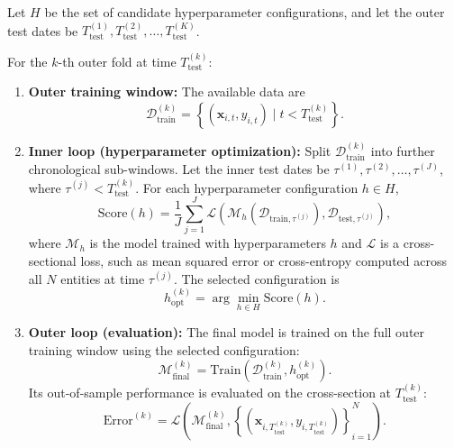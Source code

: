 \medskip

Let $H$ be the set of candidate hyperparameter configurations, and let the outer test dates be $T_{\mathrm{test}}^{(1)}, T_{\mathrm{test}}^{(2)}, \dots, T_{\mathrm{test}}^{(K)}$.

\medskip

For the $k$-th outer fold at time $T_{\mathrm{test}}^{(k)}$:
\begin{enumerate}[topsep=0pt, itemsep=0pt, parsep=0pt]
	\item \textbf{Outer training window:} The available data are
	      \begin{equation}
		      \mathcal{D}_{\mathrm{train}}^{(k)}
		      =
		      \left\{
		      (\mathbf{x}_{i,t}, y_{i,t})
		      \mid
		      t < T_{\mathrm{test}}^{(k)}
		      \right\}.
	      \end{equation}

	\item \textbf{Inner loop (hyperparameter optimization):}
	      Split $\mathcal{D}_{\mathrm{train}}^{(k)}$ into further chronological sub-windows. Let the inner test dates be $\tau^{(1)}, \tau^{(2)}, \dots, \tau^{(J)}$, where $\tau^{(j)} < T_{\mathrm{test}}^{(k)}$. For each hyperparameter configuration $h \in H$,
	      \begin{equation}
		      \mathrm{Score}(h)
		      =
		      \dfrac{1}{J}
		      \sum_{j=1}^{J}
		      \mathcal{L}
		      \left(
		      \mathcal{M}_h
		      \left(
		      \mathcal{D}_{\mathrm{train},\tau^{(j)}}
		      \right),
		      \mathcal{D}_{\mathrm{test},\tau^{(j)}}
		      \right),
		      \label{eq:inner-score}
	      \end{equation}
	      where $\mathcal{M}_h$ is the model trained with hyperparameters $h$ and $\mathcal{L}$ is a cross-sectional loss, such as mean squared error or cross-entropy computed across all $N$ entities at time $\tau^{(j)}$. The selected configuration is
	      \begin{equation}
		      h_{\mathrm{opt}}^{(k)}
		      =
		      \arg\min_{h \in H}
		      \mathrm{Score}(h).
	      \end{equation}

	\item \textbf{Outer loop (evaluation):}
	      The final model is trained on the full outer training window using the selected configuration:
	      \begin{equation}
		      \mathcal{M}_{\mathrm{final}}^{(k)}
		      =
		      \mathrm{Train}
		      \left(
		      \mathcal{D}_{\mathrm{train}}^{(k)},
		      h_{\mathrm{opt}}^{(k)}
		      \right).
		      \label{eq:final-model}
	      \end{equation}
	      Its out-of-sample performance is evaluated on the cross-section at $T_{\mathrm{test}}^{(k)}$:
	      \begin{equation}
		      \mathrm{Error}^{(k)}
		      =
		      \mathcal{L}
		      \left(
		      \mathcal{M}_{\mathrm{final}}^{(k)},
		      \left\{
		      (\mathbf{x}_{i,T_{\mathrm{test}}^{(k)}},
		      y_{i,T_{\mathrm{test}}^{(k)}})
		      \right\}_{i=1}^{N}
		      \right).
		      \label{eq:outer-error}
	      \end{equation}
\end{enumerate}

